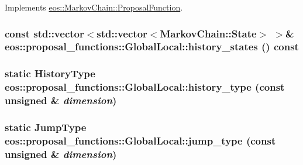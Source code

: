 Implements \hyperlink{structeos_1_1MarkovChain_1_1ProposalFunction_ae3f2c43980ec9dfe9f35d8139f2f4ec7}{eos::MarkovChain::ProposalFunction}.\hypertarget{classeos_1_1proposal__functions_1_1GlobalLocal_ab29f6d1d7b79dcb8eae4647260a5bd06}{
\subsubsection[{history\_\-states}]{\setlength{\rightskip}{0pt plus 5cm}const std::vector$<$std::vector$<${\bf MarkovChain::State}$>$ $>$\& eos::proposal\_\-functions::GlobalLocal::history\_\-states () const}}
\label{classeos_1_1proposal__functions_1_1GlobalLocal_ab29f6d1d7b79dcb8eae4647260a5bd06}
\hypertarget{classeos_1_1proposal__functions_1_1GlobalLocal_af44478dfd75149c63937af4c6583fbdf}{
\subsubsection[{history\_\-type}]{\setlength{\rightskip}{0pt plus 5cm}static {\bf HistoryType} eos::proposal\_\-functions::GlobalLocal::history\_\-type (const unsigned \& {\em dimension})}}
\label{classeos_1_1proposal__functions_1_1GlobalLocal_af44478dfd75149c63937af4c6583fbdf}
\hypertarget{classeos_1_1proposal__functions_1_1GlobalLocal_a0dc6c82443a5a7f091aced9f00e9e924}{
\subsubsection[{jump\_\-type}]{\setlength{\rightskip}{0pt plus 5cm}static {\bf JumpType} eos::proposal\_\-functions::GlobalLocal::jump\_\-type (const unsigned \& {\em dimension})}}
